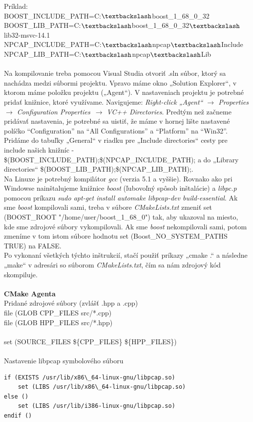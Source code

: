 \documentclass[a4paper,12pt]{article}
\begin{document}
\noindent Príklad: \\
BOOST\_INCLUDE\_PATH=C:$\textbackslash$boost\_1\_68\_0\_32 \\
BOOST\_LIB\_PATH=C:$\textbackslash$boost\_1\_68\_0\_32$\textbackslash$lib32-msvc-14.1 \\
NPCAP\_INCLUDE\_PATH=C:$\textbackslash$npcap$\textbackslash$Include \\
NPCAP\_LIB\_PATH=C:$\textbackslash$npcap$\textbackslash$Lib \\
\\
Na kompilovanie treba pomocou Visual Studia otvoriť .sln súbor, ktorý sa nachádza medzi súbormi projektu. Vpravo máme okno „Solution Explorer“, v ktorom máme položku projektu („Agent“). V nastaveniach projektu je potrebné pridať knižnice, ktoré využívame. Navigujeme:
\textit{Right-click „Agent“ $\rightarrow$ Properties $\rightarrow$ Configuration Properties~$\rightarrow$ VC++ Directories}.
Predtým než začneme pridávať nastavenia, je potrebné sa uistiť, že máme v hornej lište nastavené políčko “Configuration” na “All Configurations” a “Platform” na “Win32”. Pridáme do tabuľky „General“ v riadku pre „Include directories“ cesty pre include našich knižníc - \$(BOOST\_INCLUDE\_PATH);\$(NPCAP\_INCLUDE\_PATH);  a do „Library directories“ \$(BOOST\_LIB\_PATH);\$(NPCAP\_LIB\_PATH);. \\

Na Linuxe je potrebný kompilátor \textit{gcc} (verzia 5.1 a vyššie). Rovnako ako pri Windowse nainštalujeme knižnice \textit{boost} (ľubovoľný spôsob inštalácie) a \textit{libpc.p} pomocou príkazu \textit{sudo apt-get install automake libpcap-dev build-essential}.
Ak sme \textit{boost} kompilovali sami, treba v súbore \textit{CMakeLists.txt} zmeniť set (BOOST\_ROOT "/home/user/boost\_1\_68\_0") tak, aby ukazoval na miesto, kde sme zdrojové súbory vykompilovali. Ak sme \textit{boost} nekompilovali sami, potom zmeníme v tom istom súbore hodnotu set (Boost\_NO\_SYSTEM\_PATHS TRUE) na FALSE.
\\

Po vykonaní všetkých týchto inštrukcií, stačí použiť príkazy „cmake .“ a následne „make“ v adresári so súborom \textit{CMakeLists.txt}, čím sa nám zdrojový kód skompiluje.
\\
\\
\textbf{CMake Agenta} \\
Pridané zdrojové súbory (zvlášť .hpp a .cpp) \\
file (GLOB CPP\_FILES src/*.cpp) \\
file (GLOB HPP\_FILES src/*.hpp) \\
\\
set (SOURCE\_FILES \$\{CPP\_FILES\} \$\{HPP\_FILES\}) \\
\\
Nastavenie libpcap symbolového súboru \\
\begin{lstlisting}
if (EXISTS /usr/lib/x86\_64-linux-gnu/libpcap.so) 
	set (LIBS /usr/lib/x86\_64-linux-gnu/libpcap.so) 
else () 
	set (LIBS /usr/lib/i386-linux-gnu/libpcap.so) 
endif ()
\end{lstlisting}
\end{document}
